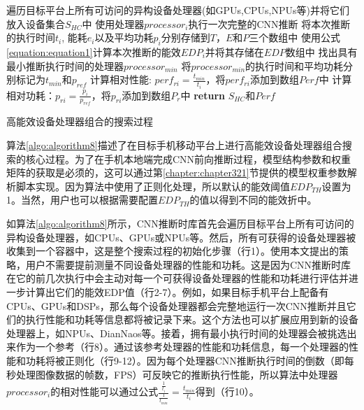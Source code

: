 \begin{algorithm}[htbp]
  \small
  \SetAlgoLined
    \begin{spacing}{0.85}
    遍历目标平台上所有可访问的异构设备处理器(如GPUs,CPUs,NPUs等)并将它们放入设备集合$S_{HC}$中\;
     {
        使用处理器$processor_i$执行一次完整的CNN推断\;
        将本次推断的执行时间$t_i$, 能耗$e_i$以及平均功耗$p_i$分别存储到$T$，$E$和$P$三个数组中\;
        使用公式\ref{equation:equation1}计算本次推断的能效$EDP_i$并将其存储在$EDP$数组中\;
    }
    找出具有最小推断执行时间的处理器$processor_{min}$\;
    将$processor_{min}$的执行时间和平均功耗分别标记为$t_{min}$和$p_{ref}$\;
     {
    计算相对性能: $perf_{ri} = \frac{t_{min}}{t_i}$，将$perf_{ri}$添加到数组$Perf$中\;
    计算相对功耗：$p_{ri} = \frac{p_{i}}{p_{ref}}$，将$p_{ri}$添加到数组$P_r$中\;
    }
    \textbf{return} $S_{HC}$和$Perf$\;
   \end{spacing}
  \caption{高能效设备处理器组合的搜索过程}
  \label{algo:algorithm8}
\end{algorithm}

算法\ref{algo:algorithm8}描述了在目标手机移动平台上进行高能效设备处理器组合搜索的核心过程。为了在手机本地端完成CNN前向推断过程，模型结构参数和权重矩阵的获取是必须的，这可以通过第\ref{chapter:chapter321}节提供的模型权重参数解析脚本实现。因为算法中使用了正则化处理，所以默认的能效阈值$EDP_{TH}$设置为1。当然，用户也可以根据需要配置$EDP_{TH}$的值以得到不同的能效折中。

如算法\ref{algo:algorithm8}所示，CNN推断时库首先会遍历目标平台上所有可访问的异构设备处理器，如CPUs、GPUs或NPUs等。然后，所有可获得的设备处理器被收集到一个容器中，这是整个搜索过程的初始化步骤（行1）。使用本文提出的策略，用户不需要提前测量不同设备处理器的性能和功耗。这是因为CNN推断时库在它的前几次执行中会主动对每一个可获得设备处理器的性能和功耗进行评估并进一步计算出它们的能效EDP值（行2-7）。例如，如果目标手机平台上配备有CPUs、GPUs和DSPs，那么每个设备处理器都会完整地运行一次CNN推断并且它们的执行性能和功耗等信息都将被记录下来。这个方法也可以扩展应用到新的设备处理器上，如NPUs、DianNaos\cite{chen2014diannao}等。接着，拥有最小执行时间的处理器会被挑选出来作为一个参考（行8）。通过该参考处理器的性能和功耗信息，每一个处理器的性能和功耗将被正则化（行9-12）。因为每个处理器CNN推断执行时间的倒数（即每秒处理图像数据的帧数，FPS）可反映它的推断执行性能，所以算法中处理器$processor_i$的相对性能可以通过公式$\frac{\frac{1}{t_i}}{\frac{1}{t_{min}}}=\frac{t_{min}}{t_i}$得到（行10）。

